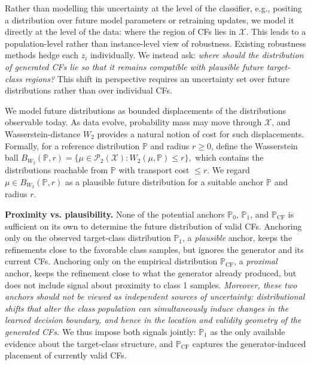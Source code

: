 Rather than modelling this uncertainty at the level of the classifier, e.g., positing a distribution over future model parameters or retraining updates, we model it directly at the level of the data: where the region of CFs lies in $\mathcal{X}$.
This leads to a population-level rather than instance-level view of robustness.
Existing robustness methods hedge each $z_i$ individually. We instead ask: \emph{where should the distribution of generated CFs lie so that it remains compatible with plausible future target-class regions?} 
This shift in perspective requires an uncertainty set over future distributions rather than over individual CFs.

We model future distributions as bounded displacements of the distributions observable today. 
As data evolve, probability mass may move through $\mathcal{X}$, and Wasserstein-distance $W_2$ provides a natural notion of cost for such displacements. 
Formally, for a reference distribution $\mathbb{P}$ and radius $r\geq0$, define the Wasserstein ball $
B_{W_2}(\mathbb P,r)
=
\{\mu\in\mathcal P_2(\mathcal X): W_2(\mu,\mathbb P)\le r\},
$ which contains the distributions reachable from $\mathbb{P}$ with transport cost $\le r$. 
We regard $\mu\in B_{W_2}(\mathbb P,r)$ as a plausible future distribution for a suitable anchor $\mathbb{P}$ and radius $r$.


\textbf{Proximity vs. plausibility.}
None of the potential anchors $\mathbb{P}_0$, $\mathbb{P}_1$, and $\mathbb{P}_{\mathrm{CF}}$ is sufficient on its own to determine the future distribution of valid CFs. 
Anchoring only on the observed target-class distribution $\mathbb{P}_1$, a \emph{plausible} anchor, keeps the refinements close to the favorable class samples, but ignores the generator and its current CFs. Anchoring only on the empirical distribution $\mathbb{P}_{\mathrm{CF}}$, a \emph{proximal} anchor, keeps the refinement close to what the generator already produced, but does not include signal about proximity to class 1 samples. \emph{Moreover, these two anchors should not be viewed as independent sources of uncertainty: distributional shifts that alter the class population can simultaneously induce changes in the learned decision boundary, and hence in the location and validity geometry of the generated CFs.}
We thus impose both signals jointly: $\mathbb{P}_1$ as the only available evidence about the target-class structure, and $\mathbb{P}_{\mathrm{CF}}$ captures the generator-induced placement of currently valid CFs.

